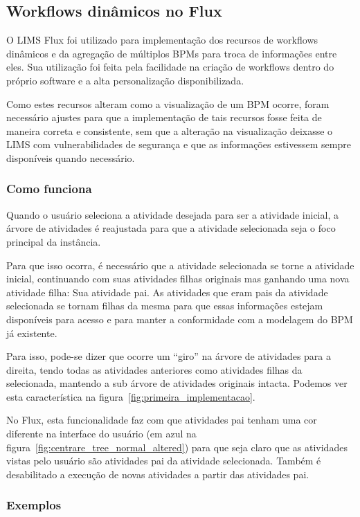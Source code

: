 \subsection{Workflows dinâmicos no Flux}

O LIMS Flux foi utilizado para implementação dos recursos de workflows dinâmicos e da agregação de múltiplos BPMs para troca de informações entre eles. Sua utilização foi feita pela facilidade na criação de workflows dentro do próprio software e a alta personalização disponibilizada.

Como estes recursos alteram como a visualização de um BPM ocorre, foram necessário ajustes para que a implementação de tais recursos fosse feita de maneira correta e consistente, sem que a alteração na visualização deixasse o LIMS com vulnerabilidades de segurança e que as informações estivessem sempre disponíveis quando necessário.

\subsubsection{Como funciona}

Quando o usuário seleciona a atividade desejada para ser a atividade inicial, a árvore de atividades é reajustada para que a atividade selecionada seja o foco principal da instância.

Para que isso ocorra, é necessário que a atividade selecionada se torne a atividade inicial, continuando com suas atividades filhas originais mas ganhando uma nova atividade filha: Sua atividade pai. As atividades que eram pais da atividade selecionada se tornam filhas da mesma para que essas informações estejam disponíveis para acesso e para manter a conformidade com a modelagem do BPM já existente.

Para isso, pode-se dizer que ocorre um ``giro'' na árvore de atividades para a direita, tendo todas as atividades anteriores como atividades filhas da selecionada, mantendo a sub árvore de atividades originais intacta. Podemos ver esta característica na figura~\ref{fig:primeira_implementacao}.

No Flux, esta funcionalidade faz com que atividades pai tenham uma cor diferente na interface do usuário (em azul na figura~\ref{fig:centrare_tree_normal_altered}) para que seja claro que as atividades vistas pelo usuário são atividades pai da atividade selecionada. Também é desabilitado a execução de novas atividades a partir das atividades pai.

\subsubsection{Exemplos} \label{sec:dinamic_workflows_examples}

